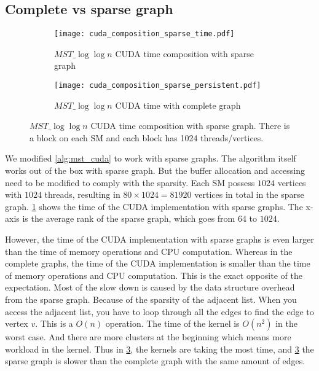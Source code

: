 \documentclass[english, 12pt, a4paper, elec, utf8, a-2b, online]{aaltothesis}
\newcommand{\mstalgo}{$MST\_\log\log{n}$}
\begin{document}

\subsection{Complete vs sparse graph}

\begin{figure}[h]
	\begin{subfigure}[b]{0.45\textwidth}
		\centering
		\texttt{[image: cuda\_composition\_sparse\_time.pdf]}
		\caption{\mstalgo{} CUDA time composition with sparse graph}
		\label{fig:cuda_composition_sparse_time.pdf}
	\end{subfigure}
	\begin{subfigure}[b]{0.45\textwidth}
		\centering
		\texttt{[image: cuda\_composition\_sparse\_persistent.pdf]}
		\caption{\mstalgo{} CUDA time with complete graph}
		\label{fig:cuda_composition_sparse_persistent.pdf}
	\end{subfigure}
	\caption{\mstalgo{} CUDA time composition with sparse graph. There is a block on each SM and each block has 1024 threads/vertices.}
	\label{fig:cuda_composition_sparse}
\end{figure}

We modified \cref{alg:mst_cuda} to work with sparse graphs. The algorithm itself works out of the box with sparse graph. But the buffer allocation and accessing need to be modified to comply with the sparsity. Each SM possess $1024$ vertices with $1024$ threads, resulting in $80 \times 1024 = 81920$ vertices in total in the sparse graph. \cref{fig:cuda_composition_sparse_time.pdf} shows the time of the CUDA implementation with sparse graphs. The x-axis is the average rank of the sparse graph, which goes from $64$ to $1024$.

However, the time of the CUDA implementation with sparse graphs is even larger than the time of memory operations and CPU computation. Whereas in the complete graphs, the time of the CUDA implementation is smaller than the time of memory operations and CPU computation. This is the exact opposite of the expectation. Most of the slow down is caused by the data structure overhead from the sparse graph. Because of the sparsity of the adjacent list. When you access the adjacent list, you have to loop through all the edges to find the edge to vertex $v$. This is a $O(n)$ operation. The time of the kernel is $O(n^2)$ in the worst case.  And there are more clusters at the beginning which means more workload in the kernel. Thus in \cref{fig:cuda_composition_sparse}, the kernels are taking the most time, and \cref{fig:cuda_composition_sparse} the sparse graph is slower than the complete graph with the same amount of edges.
\end{document}
